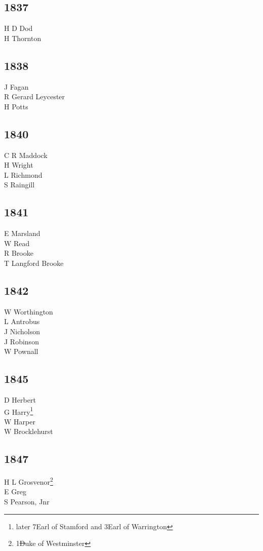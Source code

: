 \begin{multicols}{3}
  \subsection*{1837}
  H D Dod \\
  H Thornton \\
  \subsection*{1838}
  J Fagan \\
  R Gerard Leycester \\
  H Potts \\
  \subsection*{1840}
  C R Maddock \\
  H Wright \\
  L Richmond \\
  S Raingill \\
  \subsection*{1841}
  E Marsland \\
  W Read \\
  R Brooke \\
  T Langford Brooke \\
  \subsection*{1842}
  W Worthington \\
  L Antrobus \\
  J Nicholson \\
  J Robinson \\
  W Pownall \\
  \subsection*{1845}
  D Herbert \\
  G Harry\footnote{later 7\nth Earl of Stamford and 3\rd Earl of Warrington} \\
  W Harper \\
  W Brocklehurst \\
  \subsection*{1847}
  H L Grosvenor\footnote{1\st Duke of Westminster} \\
  E Greg \\
  S Pearson, Jnr \\

\end{multicols}
